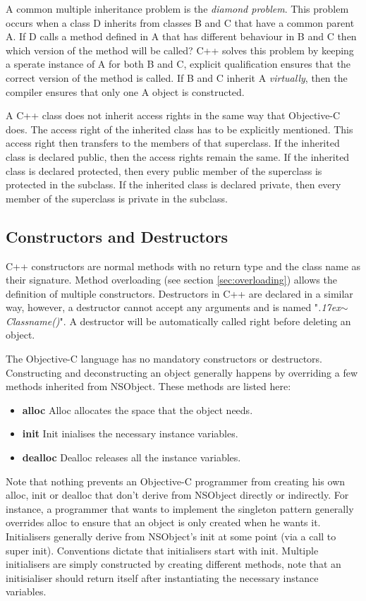 \documentclass[11pt, a4paper, twocolumn]{article}
\newcommand{\mytilde}{\raise.17ex\hbox{$\scriptstyle\mathtt{\sim}$}}
\begin{document}
A common multiple inheritance problem is the \textit{diamond problem}. This problem occurs when a class D inherits from classes B and C that have a common parent A. If D calls a method defined in A that has different behaviour in B and C then which version of the method will be called? C++ solves this problem by keeping a sperate instance of A for both B and C, explicit qualification ensures that the correct version of the method is called. If B and C inherit A \textit{virtually}, then the compiler ensures that only one A object is constructed.

A C++ class does not inherit access rights in the same way that Objective-C does. The access right of the inherited class has to be explicitly mentioned. This access right then transfers to the members of that superclass. If the inherited class is declared public, then the access rights remain the same. If the inherited class is declared protected, then every public member of the superclass is protected in the subclass. If the inherited class is declared private, then every member of the superclass is private in the subclass.

\subsection{Constructors and Destructors}
\label{sec:constructor}
C++ constructors are normal methods with no return type and the class name as their signature. Method overloading (see section \ref{sec:overloading}) allows the definition of multiple constructors. Destructors in C++ are declared in a similar way, however, a destructor cannot accept any arguments and is named "\textit{\mytilde{}Classname()}". A destructor will be automatically called right before deleting an object.

The Objective-C language has no mandatory constructors or destructors. Constructing and deconstructing an object generally happens by overriding a few methods inherited from NSObject. These methods are listed here: 
\begin{itemize}
\item \textbf {alloc} Alloc allocates the space that the object needs.
\item \textbf {init} Init inialises the necessary instance variables.
\item \textbf {dealloc} Dealloc releases all the instance variables.
\end{itemize}

Note that nothing prevents an Objective-C programmer from creating his own alloc, init or dealloc that don't derive from NSObject directly or indirectly. For instance, a programmer that wants to implement the singleton pattern generally overrides alloc to ensure that an object is only created when he wants it.
Initialisers generally derive from NSObject's init at some point (via a call to super init). Conventions dictate that initialisers start with init. Multiple initialisers are simply constructed by creating different methods, note that an initisialiser should return itself after instantiating the necessary instance variables.
\end{document}
